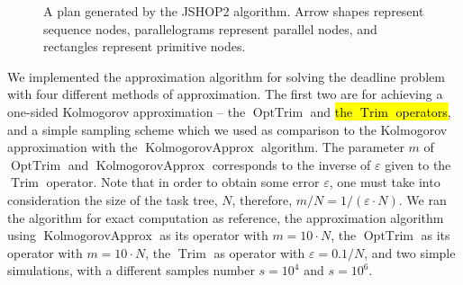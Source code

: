 \documentclass{article}
\DeclareMathOperator{\Trim}{Trim}
\DeclareMathOperator{\KlmApprox}{KolmogorovApprox}
\DeclareMathOperator{\OptTrim}{OptTrim}
\begin{document}
\begin{figure}[htb]
{
	}
	
	\caption{A plan generated by the JSHOP2 algorithm. Arrow shapes represent sequence
		nodes, parallelograms represent parallel nodes, and rectangles represent primitive nodes.}
	\label{fig:logistics}
	
\end{figure}  

We implemented the approximation algorithm for solving the deadline problem with four different methods of approximation. The first two are for achieving a one-sided Kolmogorov approximation -- the $\OptTrim$ and \hl{the $\Trim$ operators}, and a simple sampling scheme which we used as comparison to the  Kolmogorov approximation with the $\KlmApprox$ algorithm. 
The parameter $m$ of $\OptTrim$ and $\KlmApprox$ corresponds to the inverse of $\varepsilon$ given to the $\Trim$ operator. Note that in order to obtain some error $\varepsilon$, one must take into consideration the size of the task tree, $N$, therefore, $m/N=1/(\varepsilon\cdot N)$. We ran the algorithm for exact computation as reference, the approximation algorithm using $\KlmApprox$ as its operator with $m=10\cdot N$, the $\OptTrim$ as its operator with $m=10\cdot N$, the $\Trim$ as operator with $\varepsilon={0.1/N}$, and two simple simulations, with a different samples number $s=10^4$ and $s=10^6$. 
\end{document}
